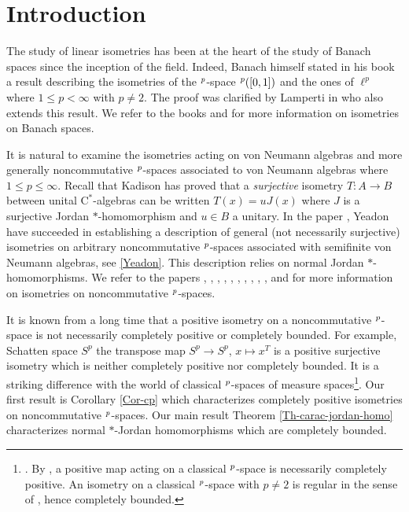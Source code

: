 \documentclass[leqno]{article} %
\let\L\relax
\newcommand{\L}{\mathrm{L}}
\renewcommand{\leq}{\ensuremath{\leqslant}}
\newcommand{\co}{\colon}
\numberwithin{equation}{section}
\begin{document}
\tableofcontents

\section{Introduction}
\label{sec:Introduction}

The study of linear isometries has been at the heart of the study of Banach spaces since the inception of the field. Indeed, Banach himself stated in his book \cite{Ban1} a result describing the isometries of the $\L^p$-space $\L^p([0,1])$ and the ones of $\ell^p$ where $1 \leq p <\infty$ with $p \not=2$. The proof was clarified by Lamperti in \cite{Lam1} who also extends this result. We refer to the books \cite{FJ1} and \cite{FJ2} for more information on isometries on Banach spaces.

It is natural to examine the isometries acting on von Neumann algebras and more generally noncommutative $\L^p$-spaces associated to von Neumann algebras where $1 \leq p \leq \infty$. Recall that Kadison \cite{Kad1} has proved that a \textit{surjective} isometry $T \co A \to B$ between unital $\mathrm{C}^*$-algebras can be written $T(x)=uJ(x)$ where $J$ is a surjective Jordan $*$-homomorphism and $u \in B$ a unitary. In the paper \cite{Yea1}, Yeadon have succeeded in establishing a description of general (not necessarily surjective) isometries on arbitrary noncommutative $\L^p$-spaces associated with semifinite von Neumann algebras, see \eqref{Yeadon}. This description relies on normal Jordan $*$-homomorphisms. We refer to the papers \cite{ArF3}, \cite{HRW1}, \cite{HSZ1}, \cite{JRS1}, \cite{LMZ1}, \cite{LMZ2}, \cite{She1}, \cite{SuV1}, \cite{Wat2}, \cite{Wat3}, \cite{Wat4} and \cite{Wat5} for more information on isometries on noncommutative $\L^p$-spaces.

It is known from a long time that a positive isometry on a noncommutative $\L^p$-space is not necessarily completely positive or completely bounded. For example, Schatten space $S^p$ the transpose map $S^p \to S^p$, $x \mapsto x^T$ is a positive surjective isometry which is neither completely positive nor completely bounded. It is a striking difference with the world of classical $\L^p$-spaces of measure spaces\footnote{\thefootnote. By \cite[Proposition 2.22]{ArK}, a positive map acting on a classical $\L^p$-space is necessarily completely positive. An isometry on a classical $\L^p$-space with $p \not=2$ is regular in the sense of \cite[(1.1)]{ArK}, hence completely bounded.}. Our first result is Corollary \ref{Cor-cp} which characterizes completely positive isometries on noncommutative $\L^p$-spaces. Our main result Theorem \ref{Th-carac-jordan-homo} characterizes normal $*$-Jordan homomorphisms which are completely bounded.
\end{document}
